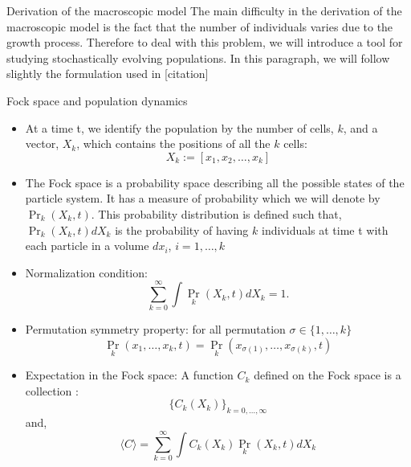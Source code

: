 \begin{paragraph}{Derivation of the macroscopic model}
The main difficulty in the derivation of the macroscopic model is the fact that the number of individuals varies due to the growth process. Therefore to deal with this problem, we will introduce a tool for studying stochastically evolving populations. In this paragraph, we will follow slightly the formulation used in [citation]

\begin{paragraph}{Fock space and population dynamics}
\begin{itemize}
	\item At a time t, we identify the population by the number of cells, $k$, and a vector, $X_k$, which contains the positions of all the $k$ cells: 
	\begin{equation}
		X_k := \left[ x_1, x_2, \ldots, x_k \right] 
	\end{equation}	  
    \item The Fock space is a probability space describing all the possible states of the particle system. It has a measure of probability which we will denote by $\Pr_k(X_k, t)$. This probability distribution is defined such that, $\Pr_k(X_k, t)dX_k$ is the probability of having $k$ individuals at time t with each particle in a volume $dx_i$, $i= 1, \ldots, k$
    \item Normalization condition:
    \begin{equation}
       \sum_{k=0}^{\infty} \int \Pr_k(X_k, t) dX_k = 1.
    \end{equation}
	\item Permutation symmetry property:
	for all permutation $\sigma \in \{1, \ldots, k\}$
	\begin{equation}
	\label{permutationSymmetry}
	\Pr_k(x_1, \ldots,  x_k, t) = \Pr_k(x_ {\sigma(1)}, \ldots, x_{\sigma(k)}, t)
	\end{equation}
	\item Expectation in the Fock space: 
	 A function $C_k$ defined on the Fock space is a collection : 
	 $$ \{ C_k(X_k) \}_{k=0, \ldots, \infty} $$
	 and,
	 \begin{equation}
	 \label{expectationFormulae}
	 	\langle C \rangle = \sum_{k=0}^{\infty} \int C_k(X_k) \Pr_k(X_k, t) dX_k
	 \end{equation}	  
\end{itemize}
\end{paragraph}


\end{paragraph}
